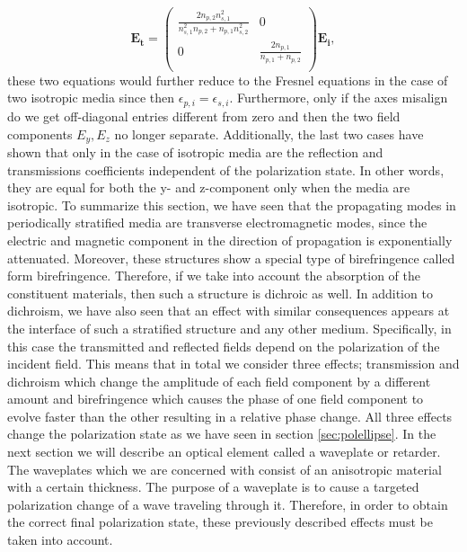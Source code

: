 \begin{equation}
    \bm{E_t} =
    \begin{pmatrix}
        \frac{2n_{p,2}n_{s,1}^2}{n_{s,1}^2n_{p,2}+n_{p,1}n_{s,2}^2} & 0 \\
        0 & \frac{2n_{p,1}}{n_{p,1}+n_{p,2}} \\
    \end{pmatrix}
    \bm{E_i},
\end{equation}
these two equations would further reduce to the Fresnel equations in the case of two isotropic media since then $\epsilon_{p,i}=\epsilon_{s,i}$. Furthermore, only if the axes misalign do we get off-diagonal entries different from zero and then the two field components $E_y, E_z$ no longer separate. Additionally, the last two cases have shown that only in the case of isotropic media are the reflection and transmissions coefficients independent of the polarization state. In other words, they are equal for both the y- and z-component only when the media are isotropic. To summarize this section, we have seen that the propagating modes in periodically stratified media are transverse electromagnetic modes, since the electric and magnetic component in the direction of propagation is exponentially attenuated. Moreover, these structures show a special type of birefringence called form birefringence. Therefore, if we take into account the absorption of the constituent materials, then such a structure is dichroic as well. In addition to dichroism, we have also seen that an effect with similar consequences appears at the interface of such a stratified structure and any other medium. Specifically, in this case the transmitted and reflected fields depend on the polarization of the incident field. This means that in total we consider three effects; transmission and dichroism which change the amplitude of each field component by a different amount and birefringence which causes the phase of one field component to evolve faster than the other resulting in a relative phase change. All three effects change the polarization state as we have seen in section \ref{sec:polellipse}. In the next section we will describe an optical element called a waveplate or retarder. The waveplates which we are concerned with consist of an anisotropic material with a certain thickness. The purpose of a waveplate is to cause a targeted polarization change of a wave traveling through it. Therefore, in order to obtain the correct final polarization state, these previously described effects must be taken into account. 

